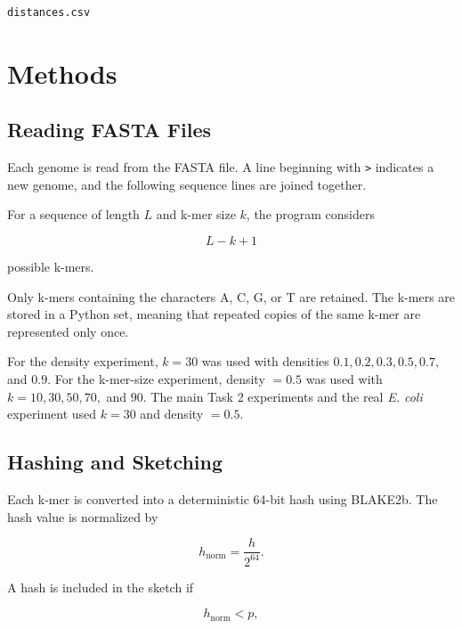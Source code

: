 \documentclass[11pt,a4paper]{article}
\begin{document}
\begin{lstlisting}
distances.csv
\end{lstlisting}


\section{Methods}

\subsection{Reading FASTA Files}

Each genome is read from the FASTA file. A line beginning with \texttt{>}
indicates a new genome, and the following sequence lines are joined together.

For a sequence of length $L$ and k-mer size $k$, the program considers

\begin{equation}
L-k+1
\end{equation}

possible k-mers.

Only k-mers containing the characters A, C, G, or T are retained. The k-mers
are stored in a Python set, meaning that repeated copies of the same k-mer
are represented only once.

For the density experiment, $k=30$ was used with densities
$0.1, 0.2, 0.3, 0.5, 0.7,$ and $0.9$. For the k-mer-size experiment,
density $=0.5$ was used with $k=10, 30, 50, 70,$ and $90$. The main
Task 2 experiments and the real \textit{E. coli} experiment used
$k=30$ and density $=0.5$.
\subsection{Hashing and Sketching}

Each k-mer is converted into a deterministic 64-bit hash using BLAKE2b.
The hash value is normalized by

\begin{equation}
h_{\mathrm{norm}}=\frac{h}{2^{64}}.
\end{equation}

A hash is included in the sketch if

\begin{equation}
h_{\mathrm{norm}} < p,
\end{equation}
\end{document}
